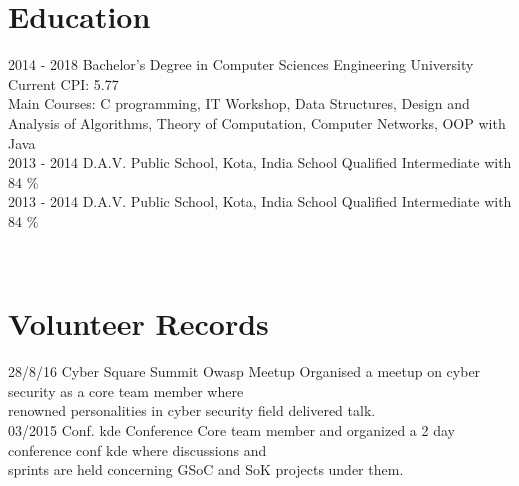 \documentclass[]{friggeri-cv}
\begin{document}
\section{Education}
\begin{entrylist}
  \entry
    {2014 - 2018}
    {Bachelor's Degree in Computer Sciences Engineering}
    {University}
    {Current CPI: 5.77 \\Main Courses: C programming, IT Workshop, Data Structures, Design and Analysis of Algorithms, Theory of Computation, Computer Networks, OOP with Java\\}
  \entry
    {2013 - 2014}
    {D.A.V. Public School, Kota, India}
    {School}
    {Qualified Intermediate with 84 \% \\}
  \entry
    {2013 - 2014}
    {D.A.V. Public School, Kota, India}
    {School}
    {Qualified Intermediate with 84 \%}
\end{entrylist}
~

\section{Volunteer Records}
\begin{entrylist}
  \entry
    {28/8/16}
    {Cyber Square Summit}
    {Owasp Meetup}
    {Organised a meetup on cyber security as a core team member where \\renowned personalities in cyber security field delivered talk.\\}
  \entry
    {03/2015}
    {Conf. kde}
    {Conference}
    {Core team member and organized a 2 day conference conf kde where discussions and \\sprints are held concerning GSoC and SoK projects under them.}
\end{entrylist}
\end{document}
